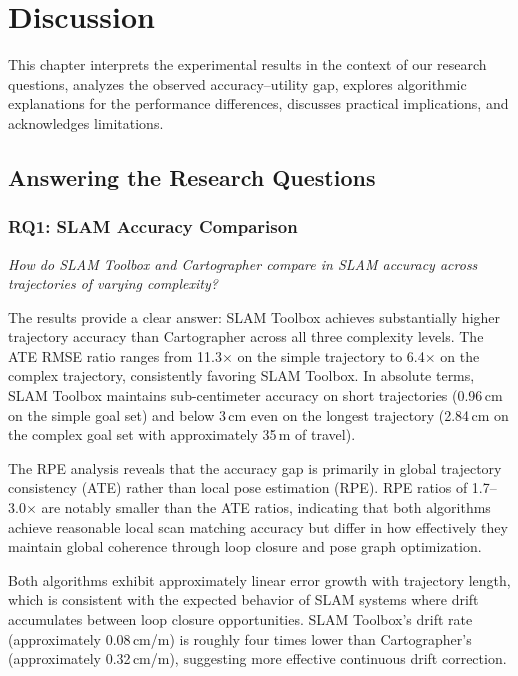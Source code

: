 \chapter{Discussion}
\label{ch:discussion}

This chapter interprets the experimental results in the context of our research questions, analyzes the observed accuracy--utility gap, explores algorithmic explanations for the performance differences, discusses practical implications, and acknowledges limitations.

\section{Answering the Research Questions}

\subsection{RQ1: SLAM Accuracy Comparison}

\emph{How do SLAM Toolbox and Cartographer compare in SLAM accuracy across trajectories of varying complexity?}

The results provide a clear answer: SLAM Toolbox achieves substantially higher trajectory accuracy than Cartographer across all three complexity levels. The ATE RMSE ratio ranges from 11.3$\times$ on the simple trajectory to 6.4$\times$ on the complex trajectory, consistently favoring SLAM Toolbox. In absolute terms, SLAM Toolbox maintains sub-centimeter accuracy on short trajectories (0.96\,cm on the simple goal set) and below 3\,cm even on the longest trajectory (2.84\,cm on the complex goal set with approximately 35\,m of travel).

The RPE analysis reveals that the accuracy gap is primarily in global trajectory consistency (ATE) rather than local pose estimation (RPE). RPE ratios of 1.7--3.0$\times$ are notably smaller than the ATE ratios, indicating that both algorithms achieve reasonable local scan matching accuracy but differ in how effectively they maintain global coherence through loop closure and pose graph optimization.

Both algorithms exhibit approximately linear error growth with trajectory length, which is consistent with the expected behavior of SLAM systems where drift accumulates between loop closure opportunities. SLAM Toolbox's drift rate (approximately 0.08\,cm/m) is roughly four times lower than Cartographer's (approximately 0.32\,cm/m), suggesting more effective continuous drift correction.

